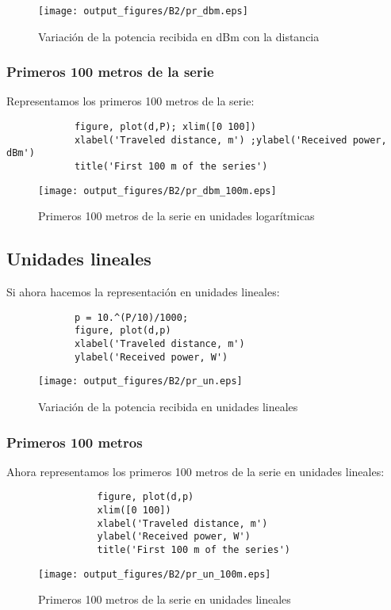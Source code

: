 \documentclass{article}
\begin{document}
    \begin{figure}[h]
         \centering
         \texttt{[image: output\_figures/B2/pr\_dbm.eps]}
         \caption{Variación de la potencia recibida en dBm con la distancia}
         \label{fig:my_label}   
    \end{figure}
    \subsubsection{Primeros 100 metros de la serie}
        \par Representamos los primeros 100 metros de la serie:
        \begin{lstlisting}
            figure, plot(d,P); xlim([0 100])
            xlabel('Traveled distance, m') ;ylabel('Received power, dBm')
            title('First 100 m of the series')  
        \end{lstlisting}
        \clearpage
        \begin{figure}[h]
            \centering
            \texttt{[image: output\_figures/B2/pr\_dbm\_100m.eps]}
            \caption{Primeros 100 metros de la serie en unidades logarítmicas}
            \label{fig:my_label}
        \end{figure}
    \subsection{Unidades lineales}
        \par Si ahora hacemos la representación en unidades lineales:
        \begin{lstlisting}
            p = 10.^(P/10)/1000;
            figure, plot(d,p)
            xlabel('Traveled distance, m')
            ylabel('Received power, W')
        \end{lstlisting}
        \begin{figure}[h]
            \centering
            \texttt{[image: output\_figures/B2/pr\_un.eps]}
            \caption{Variación de la potencia recibida en unidades lineales}
            \label{fig:my_label}
        \end{figure}
        \subsubsection{Primeros 100 metros}
            \par Ahora representamos los primeros 100 metros de la serie en unidades lineales:
            \begin{lstlisting}
                figure, plot(d,p)
                xlim([0 100])
                xlabel('Traveled distance, m')
                ylabel('Received power, W')
                title('First 100 m of the series')
            \end{lstlisting}
            \begin{figure}[h]
                \centering
                \texttt{[image: output\_figures/B2/pr\_un\_100m.eps]}
                \caption{Primeros 100 metros de la serie en unidades lineales}
                \label{fig:my_label}
            \end{figure}
\end{document}
